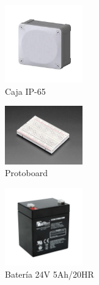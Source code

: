 \documentclass[12pt]{article}
\begin{document}
\begin{figure}[h!]
      \centering
      \includegraphics[width=0.3\textwidth]{imagenes/caja.png}
      \caption{Caja IP-65}
      \label{fig:caja}
\end{figure}

\begin{figure}[h!]
      \centering
      \includegraphics[width=0.3\textwidth]{imagenes/breadboard.png}
      \caption{Protoboard}
      \label{fig:breadboard}
\end{figure}

\begin{figure}[h!]
      \centering
      \includegraphics[width=0.3\textwidth]{imagenes/bateria.png}
      \caption{Batería 24V 5Ah/20HR}
      \label{fig:bateria}
\end{figure}
\end{document}
